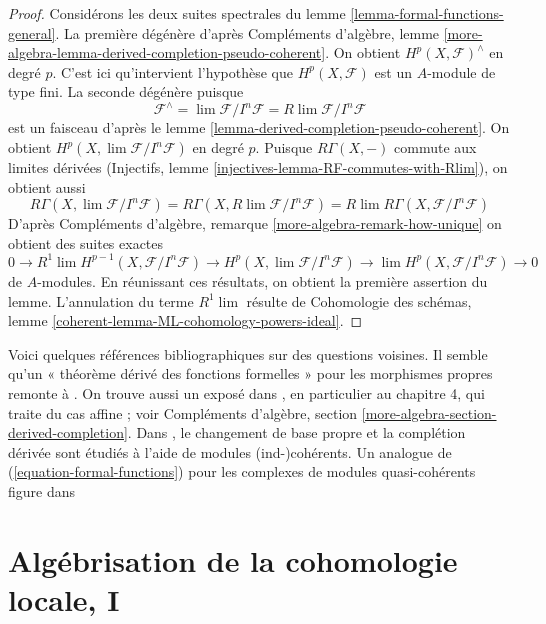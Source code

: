 \begin{proof}
Considérons les deux suites spectrales du
lemme \ref{lemma-formal-functions-general}.
La première dégénère d'après Compléments d'algèbre, lemme
\ref{more-algebra-lemma-derived-completion-pseudo-coherent}.
On obtient $H^p(X, \mathcal{F})^\wedge$ en degré $p$.
C'est ici qu'intervient l'hypothèse que $H^p(X, \mathcal{F})$ est
un $A$-module de type fini. La seconde dégénère puisque
$$
\mathcal{F}^\wedge = \lim \mathcal{F}/I^n\mathcal{F} =
R\lim \mathcal{F}/I^n\mathcal{F}
$$
est un faisceau d'après le lemme \ref{lemma-derived-completion-pseudo-coherent}.
On obtient $H^p(X, \lim \mathcal{F}/I^n\mathcal{F})$ en degré $p$.
Puisque $R\Gamma(X, -)$ commute aux limites dérivées
(Injectifs, lemme \ref{injectives-lemma-RF-commutes-with-Rlim}),
on obtient aussi
$$
R\Gamma(X, \lim \mathcal{F}/I^n\mathcal{F}) =
R\Gamma(X, R\lim \mathcal{F}/I^n\mathcal{F}) =
R\lim R\Gamma(X, \mathcal{F}/I^n\mathcal{F})
$$
D'après Compléments d'algèbre, remarque
\ref{more-algebra-remark-how-unique}
on obtient des suites exactes
$$
0 \to
R^1\lim H^{p - 1}(X, \mathcal{F}/I^n\mathcal{F}) \to
H^p(X, \lim \mathcal{F}/I^n\mathcal{F}) \to
\lim H^p(X, \mathcal{F}/I^n\mathcal{F}) \to 0
$$
de $A$-modules. En réunissant ces résultats, on obtient la première assertion du lemme.
L'annulation du terme $R^1\lim$ résulte de
Cohomologie des schémas, lemme \ref{coherent-lemma-ML-cohomology-powers-ideal}.
\end{proof}

\begin{remark}
\label{remark-references}
Voici quelques références bibliographiques sur des questions voisines.
Il semble qu'un « théorème dérivé des fonctions formelles » pour les morphismes propres
remonte à \cite[théorème 6.3.1]{lurie-thesis}.
On trouve aussi un exposé dans \cite{dag12}, en particulier
au chapitre 4, qui traite du cas affine ; voir
Compléments d'algèbre, section \ref{more-algebra-section-derived-completion}.
Dans \cite[section 2.9]{G-R}, le changement de base propre et la
complétion dérivée sont étudiés à l'aide de modules (ind-)cohérents.
Un analogue de (\ref{equation-formal-functions})
pour les complexes de modules quasi-cohérents figure dans
\cite[théorème 6.5]{HL-P}
\end{remark}







\section{Algébrisation de la cohomologie locale, I}
\label{section-algebraization-sections-general}

